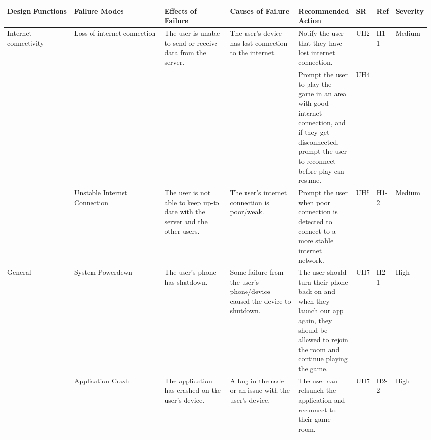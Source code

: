 \documentclass{article}
\begin{document}
\begin{table}[H]
    \begin{adjustbox}{width=(/5)}
    \centering
    

    \begin{tabular}{|p{0.20\linewidth} | p{0.30\linewidth} | p{0.20\linewidth}|  p{0.20\linewidth}|  p{0.30\linewidth}|  p{0.07\linewidth}|  p{0.07\linewidth}|p{0.12\linewidth}| }
    \hline
         \textbf{Design Functions} & \textbf{Failure Modes} & \textbf{Effects of Failure} & \textbf{Causes of Failure} & \textbf{Recommended Action} & \textbf{SR} & \textbf{Ref} & \textbf{Severity}\\
         \hline
        Internet connectivity      &      Loss of internet connection           &       The user is unable to send or receive data from the server.                      &                The user's device has lost connection to the internet.            &                  Notify the user that they have lost internet connection. &UH2&H1-1&Medium\\&&&& Prompt the user to play the game in an area with good internet connection, and if they get disconnected, prompt the user to reconnect before play can resume.           & UH4            &           &                  \\
                                   &     Unstable Internet Connection     &  The user is not able to keep up-to date with the server and the other users. &  The user's internet connection is poor/weak.    &        Prompt the user when poor connection is detected to connect to a more stable internet network.           &  UH5           &  H1-2           &    Medium              \\
          \hline
        General                    &      System Powerdown     &          The user's phone has shutdown.                   &     Some failure from the user's phone/device caused the device to shutdown.        &     The user should turn their phone back on and when they launch our app again, they should be allowed to rejoin the room and continue playing the game.       & UH7            &   H2-1           &        High          \\
                                   &       Application Crash     &      The application has crashed on the user's device.         &     A bug in the code or an issue with the user's device.     &     The user can relaunch the application and reconnect to their game room.    &  UH7           &   H2-2          &   High               \\

\end{tabular}
\end{adjustbox}
\end{table}
\end{document}
